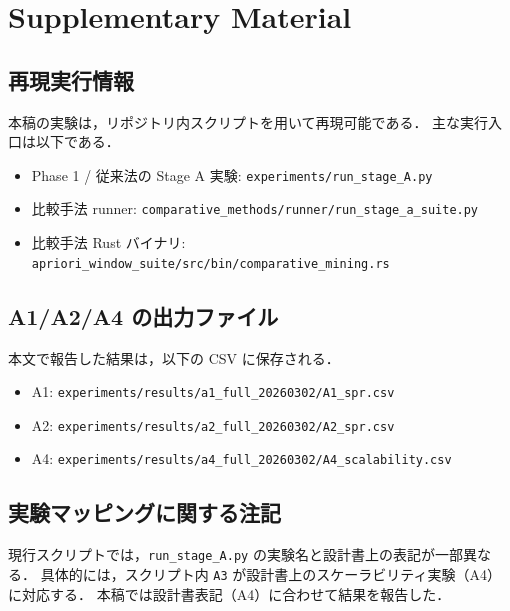 \section{Supplementary Material}
\label{sec:supplement}

\subsection{再現実行情報}
\label{sec:supp_repro}

本稿の実験は，リポジトリ内スクリプトを用いて再現可能である．
主な実行入口は以下である．
\begin{itemize}
    \item Phase 1 / 従来法の Stage A 実験: \texttt{experiments/run\_stage\_A.py}
    \item 比較手法 runner: \texttt{comparative\_methods/runner/run\_stage\_a\_suite.py}
    \item 比較手法 Rust バイナリ: \texttt{apriori\_window\_suite/src/bin/comparative\_mining.rs}
\end{itemize}

\subsection{A1/A2/A4 の出力ファイル}
\label{sec:supp_outputs}

本文で報告した結果は，以下の CSV に保存される．
\begin{itemize}
    \item A1: \texttt{experiments/results/a1\_full\_20260302/A1\_spr.csv}
    \item A2: \texttt{experiments/results/a2\_full\_20260302/A2\_spr.csv}
    \item A4: \texttt{experiments/results/a4\_full\_20260302/A4\_scalability.csv}
\end{itemize}

\subsection{実験マッピングに関する注記}
\label{sec:supp_mapping}

現行スクリプトでは，\texttt{run\_stage\_A.py} の実験名と設計書上の表記が一部異なる．
具体的には，スクリプト内 \texttt{A3} が設計書上のスケーラビリティ実験（A4）に対応する．
本稿では設計書表記（A4）に合わせて結果を報告した．
